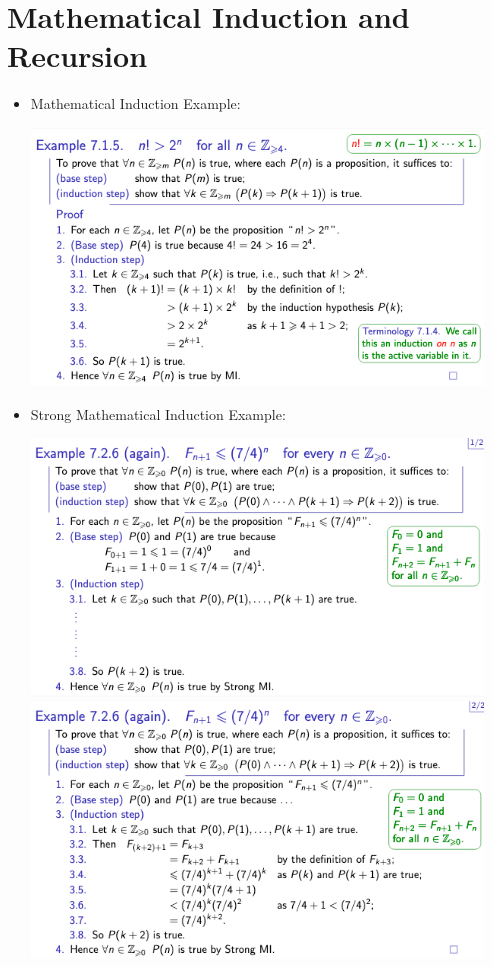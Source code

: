 \documentclass{article}
\begin{document}
\section*{Mathematical Induction and Recursion}
\begin{itemize}
    \item Mathematical Induction Example:
    
    \begin{center}
        \includegraphics[width=12cm]{miexample.png}
    \end{center}

    \item Strong Mathematical Induction Example:
    
    \begin{center}
        \includegraphics[width=12cm]{strongmiexample1.png}
        \includegraphics[width=12cm]{strongmiexample2.png}
    \end{center}


\end{itemize}
\end{document}
